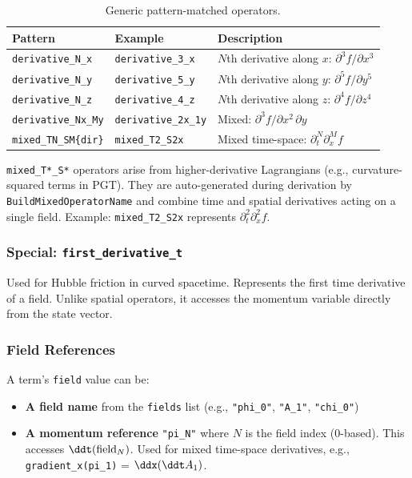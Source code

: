 \begin{table}[htbp]
\centering
\caption{Generic pattern-matched operators.}
\label{tab:json-generic-operators}
\begin{tabular}{@{}lll@{}}
\toprule
Pattern & Example & Description \\
\midrule
\texttt{derivative\_N\_x}   & \texttt{derivative\_3\_x}   & $N$th derivative along $x$: $\partial^3 f / \partial x^3$ \\
\texttt{derivative\_N\_y}   & \texttt{derivative\_5\_y}   & $N$th derivative along $y$: $\partial^5 f / \partial y^5$ \\
\texttt{derivative\_N\_z}   & \texttt{derivative\_4\_z}   & $N$th derivative along $z$: $\partial^4 f / \partial z^4$ \\
\texttt{derivative\_Nx\_My} & \texttt{derivative\_2x\_1y} & Mixed: $\partial^3 f / \partial x^2\, \partial y$ \\
\texttt{mixed\_TN\_SM\{dir\}}  & \texttt{mixed\_T2\_S2x}     & Mixed time-space: $\partial^N_t \partial^M_x f$ \\
\bottomrule
\end{tabular}
\end{table}

\texttt{mixed\_T*\_S*} operators arise from higher-derivative Lagrangians (e.g., curvature-squared terms in PGT). They are auto-generated during derivation by \texttt{BuildMixedOperatorName} and combine time and spatial derivatives acting on a single field. Example: \texttt{mixed\_T2\_S2x} represents $\partial_t^2 \partial_x^2 f$.

\subsubsection{Special: \texttt{first\_derivative\_t}}
\label{sec:json-first-derivative-t}

Used for Hubble friction in curved spacetime. Represents the first time derivative of a field. Unlike spatial operators, it accesses the momentum variable directly from the state vector.

\subsubsection{Field References}
\label{sec:json-field-references}

A term's \texttt{field} value can be:
\begin{itemize}
  \item \textbf{A field name} from the \texttt{fields} list (e.g., \texttt{"phi\_0"}, \texttt{"A\_1"}, \texttt{"chi\_0"})
  \item \textbf{A momentum reference} \texttt{"pi\_N"} where $N$ is the field index (0-based). This accesses $\ddt(\text{field}_N)$. Used for mixed time-space derivatives, e.g., \texttt{gradient\_x(pi\_1)} = $\ddx(\ddt A_1)$.
\end{itemize}

